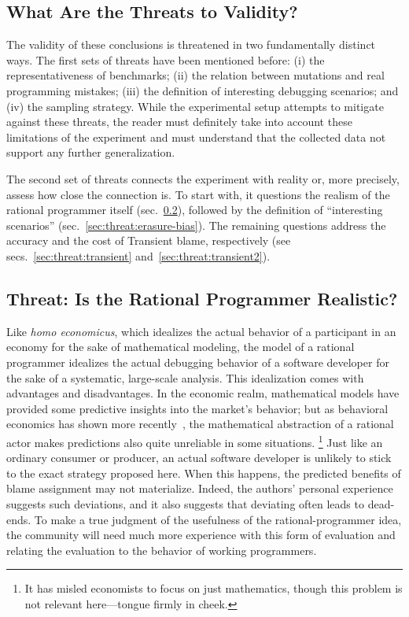 \subsection{What Are the Threats to Validity?}

The validity of these conclusions is threatened in two fundamentally distinct
ways. The first sets of threats have been mentioned before: (i) the
representativeness of benchmarks; (ii) the relation between mutations and real
programming mistakes; (iii) the definition of interesting debugging scenarios;
and (iv) the sampling strategy.  While the experimental setup attempts to
mitigate against these threats, the reader must definitely take into account
these limitations of the experiment and must understand that the collected data
not support any further generalization.

The second set of threats connects the experiment with reality or, more
precisely, assess how close the connection is. To start with, it questions the
realism of the rational programmer itself (sec.~\ref{sub:rational}), followed by
the definition of ``interesting scenarios''
(sec.~\ref{sec:threat:erasure-bias}).  The remaining questions address the
accuracy and the cost of Transient blame, respectively (see
secs.~\ref{sec:threat:transient} and~\ref{sec:threat:transient2}).

\subsection{Threat: Is the Rational Programmer Realistic?} \label{sub:rational}

Like {\em homo economicus\/}, which idealizes the actual behavior of a
participant in an economy for the sake of mathematical modeling, the model of a
rational programmer idealizes the actual debugging behavior of a software
developer for the sake of a systematic, large-scale analysis. This idealization 
comes with advantages and disadvantages. In the economic realm, mathematical
models have provided some predictive insights into the market's behavior; but as
behavioral economics has shown more recently~\cite{henrich2001search},
the mathematical abstraction of a
rational actor makes predictions also quite unreliable in some situations.
\footnote{It has misled economists to focus on just mathematics, though
this problem is not relevant here---tongue firmly in cheek.}  Just like an
ordinary consumer or producer, an actual software developer is unlikely to stick
to the exact strategy proposed here. When this happens, the predicted benefits
of blame assignment may not materialize. Indeed, the authors' personal
experience suggests such deviations, and it also suggests that deviating often leads to dead-ends.
To make a true judgment of the usefulness of the rational-programmer
idea, the community will need much more experience with this form of evaluation
and relating the evaluation to the behavior of working programmers.

